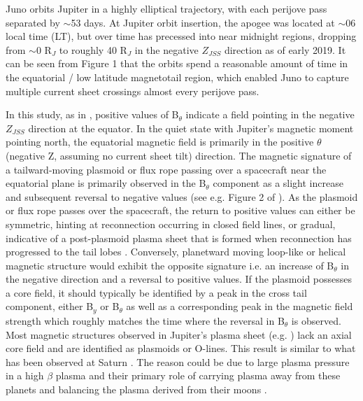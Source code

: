 Juno orbits Jupiter in a highly elliptical trajectory, with each perijove pass separated by $\sim$53 days. At Jupiter orbit insertion, the apogee was located at $\sim$06 local time (LT), but over time has precessed into near midnight regions, dropping from $\sim$0 R$_J$ to roughly 40 R$_J$ in the negative $Z_{JSS}$ direction as of early 2019. It can be seen from Figure 1 that the orbits spend a reasonable amount of time in the equatorial / low latitude magnetotail region, which enabled Juno to capture multiple current sheet crossings almost every perijove pass.

In this study, as in \cite{Vogt2010a,Vogt2014}, positive values of B$_\theta$ indicate a field pointing in the negative $Z_{JSS}$ direction at the equator. In the quiet state with Jupiter’s magnetic moment pointing north, the equatorial magnetic field is primarily in the positive $\theta$ (negative Z, assuming no current sheet tilt) direction. The magnetic signature of a tailward-moving plasmoid or flux rope passing over a spacecraft near the equatorial plane is primarily observed in the B$_\theta$ component as a slight increase and subsequent reversal to negative values (see e.g. Figure 2 of ). As the plasmoid or flux rope passes over the spacecraft, the return to positive values can either be symmetric, hinting at reconnection occurring in closed field lines, or gradual, indicative of a post-plasmoid plasma sheet that is formed when reconnection has progressed to the tail lobes \cite{Jackman2011CassiniSaturn,Jia2012}. Conversely, planetward moving loop-like or helical magnetic structure would exhibit the opposite signature i.e. an increase of B$_\theta$ in the negative direction and a reversal to positive values. If the plasmoid possesses a core field, it should typically be identified by a peak in the cross tail component, either B$_y$ or B$_\theta$ as well as a corresponding peak in the magnetic field strength which roughly matches the time where the reversal in B$_\theta$ is observed. Most magnetic structures observed in Jupiter’s plasma sheet (e.g. ) lack an axial core field and are identified as plasmoids or O-lines. This result is similar to what has been observed at Saturn \cite{Jackman2011CassiniSaturn}. The reason could be due to large plasma pressure in a high $\beta$ plasma and their primary role of carrying plasma away from these planets and balancing the plasma derived from their moons \cite{Kivelson1995ModelsPlasmas,Cowley2015Down-tailMagnetospheres}.

